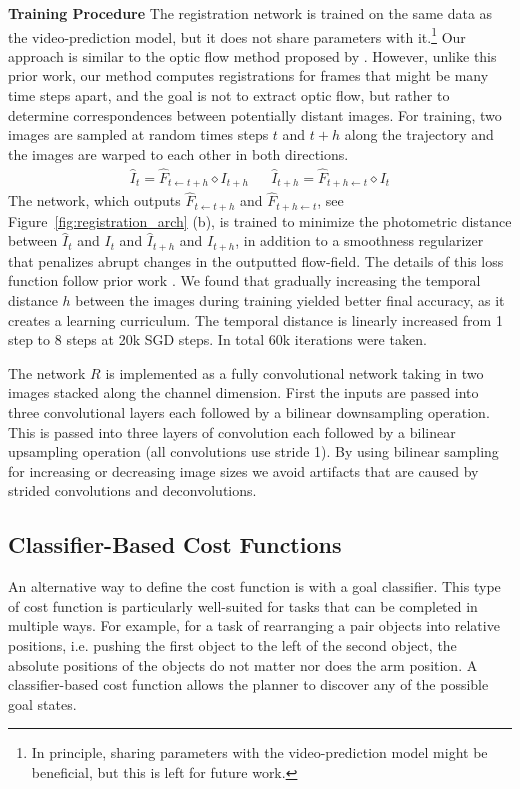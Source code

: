 \noindent \textbf{Training Procedure}
The registration network is trained on the same data as the video-prediction model, but it does not share parameters with it.\footnote{In principle, sharing parameters with the video-prediction model might be beneficial, but this is left for future work.} Our approach is similar to the optic flow method proposed by \cite{meister2017unflow}. However, unlike this prior work, our method computes registrations for frames that might be many time steps apart, and the goal is not to extract optic flow, but rather to determine correspondences between potentially distant images. For training, two images are sampled at random times steps $t$ and $t+h$ along the trajectory and the images are warped to each other in both directions. 
\begin{align}
\hat{I}_{t} = \hat{F}_{t \leftarrow t +h} \diamond  I_{t+h} &&
\hat{I}_{t+h} = \hat{F}_{t+h \leftarrow t} \diamond  I_{t}
\end{align}
The network, which outputs $\hat{F}_{t \leftarrow t +h}$ and $\hat{F}_{t+h \leftarrow t}$, see Figure~\ref{fig:registration_arch} (b), is trained to minimize the photometric distance between $\hat{I}_t$ and $I_t$ and $\hat{I}_{t+h}$ and $I_{t+h}$, in addition to a smoothness regularizer that penalizes abrupt changes in the outputted flow-field. The details of this loss function follow prior work \cite{meister2017unflow}. We found that gradually increasing the temporal distance $h$ between the images during training yielded better final accuracy, as it creates a learning curriculum. The temporal distance is linearly increased from 1 step to 8 steps at 20k SGD steps. In total 60k iterations were taken.

The network $R$ is implemented as a fully convolutional network taking in two images stacked along the channel dimension. First the inputs are passed into three convolutional layers each followed by a bilinear downsampling operation. This is passed into three layers of convolution each followed by a bilinear upsampling operation (all convolutions use stride 1). By using bilinear sampling for increasing or decreasing image sizes we avoid artifacts that are caused by strided convolutions and deconvolutions.


\subsection{Classifier-Based Cost Functions}
\label{subsec:class_cost}
An alternative way to define the cost function is with a goal classifier. This type of cost function is particularly well-suited for tasks that can be completed in multiple ways. For example, for a task of rearranging a pair objects into relative positions, i.e. pushing the first object to the left of the second object, the absolute positions of the objects do not matter nor does the arm position. A classifier-based cost function allows the planner to discover any of the possible goal states. 

